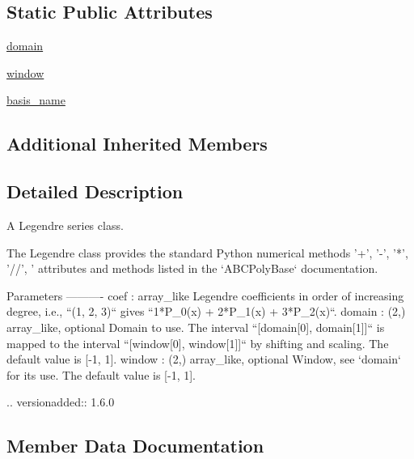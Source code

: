 \subsection*{Static Public Attributes}
\begin{DoxyCompactItemize}
\item 
\hyperlink{classnumpy_1_1polynomial_1_1legendre_1_1Legendre_af7e4210a1143495bb8cc01d1dd0d9a03}{domain}
\item 
\hyperlink{classnumpy_1_1polynomial_1_1legendre_1_1Legendre_a21b31e44f4d8ff664482afd2f81c25e5}{window}
\item 
\hyperlink{classnumpy_1_1polynomial_1_1legendre_1_1Legendre_a38e1bb958ce4350edf0b90af6b3603a7}{basis\+\_\+name}
\end{DoxyCompactItemize}
\subsection*{Additional Inherited Members}


\subsection{Detailed Description}
\begin{DoxyVerb}A Legendre series class.

The Legendre class provides the standard Python numerical methods
'+', '-', '*', '//', '%
attributes and methods listed in the `ABCPolyBase` documentation.

Parameters
----------
coef : array_like
    Legendre coefficients in order of increasing degree, i.e.,
    ``(1, 2, 3)`` gives ``1*P_0(x) + 2*P_1(x) + 3*P_2(x)``.
domain : (2,) array_like, optional
    Domain to use. The interval ``[domain[0], domain[1]]`` is mapped
    to the interval ``[window[0], window[1]]`` by shifting and scaling.
    The default value is [-1, 1].
window : (2,) array_like, optional
    Window, see `domain` for its use. The default value is [-1, 1].

    .. versionadded:: 1.6.0\end{DoxyVerb}
 

\subsection{Member Data Documentation}
\mbox{\label{classnumpy_1_1polynomial_1_1legendre_1_1Legendre_a38e1bb958ce4350edf0b90af6b3603a7}} 
